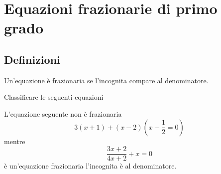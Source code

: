 \chapter{Equazioni frazionarie di primo grado}
\label{cha:Equazionefrazionariaprimogrado}
\section{Definizioni}
\label{sec:definizioni}
\begin{definizionet}{}{}
Un'equazione è frazionaria se l'incognita compare al denominatore.
\end{definizionet}
\begin{esempiot}{}{}
Classificare le seguenti equazioni
\end{esempiot}
L'equazione seguente non è frazionaria
\[3(x+1)+(x-2)(x-\dfrac{1}{2}=0) \]
mentre
\[\dfrac{3x+2}{4x+2}+x=0 \]
è un'equazione frazionaria l'incognita è al denominatore.

